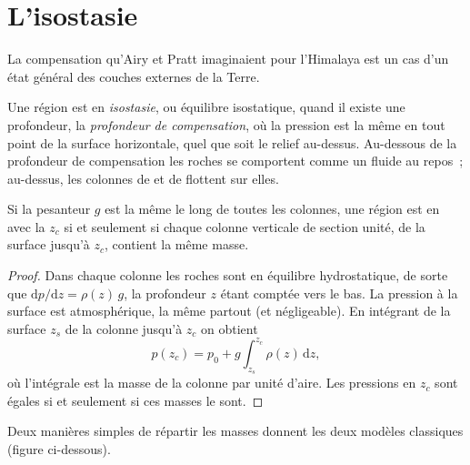 \section{L'isostasie}

La compensation qu'Airy et Pratt imaginaient pour l'Himalaya est un cas d'un état
général des couches externes de la Terre.

\begin{definition}\label{def:b1:isostasy-gravity:isostasy}
Une région est en \emph{isostasie}, ou équilibre isostatique, quand
il existe une profondeur, la \emph{profondeur de compensation},
où la pression est la même en tout point de la surface horizontale,
quel que soit le relief au-dessus. Au-dessous de la profondeur de compensation les
roches se comportent comme un fluide au repos~; au-dessus, les colonnes de  et
de  flottent sur elles.
\end{definition}

\begin{proposition}\label{prop:b1:isostasy-gravity:equal-mass}
Si la pesanteur $g$ est la même le long de toutes les colonnes, une région est en
 avec la  $z_c$ si et seulement si chaque colonne
verticale de section unité, de la surface jusqu'à $z_c$, contient la même masse.
\end{proposition}

\begin{proof}
Dans chaque colonne les roches sont en équilibre hydrostatique, de sorte que
$\mathrm dp/\mathrm dz = \rho(z)\,g$, la profondeur $z$ étant comptée vers le bas. La
pression à la surface est atmosphérique, la même partout (et négligeable).
En intégrant de la surface $z_s$ de la colonne jusqu'à $z_c$ on obtient
\[
  p(z_c) = p_0 + g\int_{z_s}^{z_c}\rho(z)\,\mathrm dz ,
\]
où l'intégrale est la masse de la colonne par unité d'aire. Les pressions en
$z_c$ sont égales si et seulement si ces masses le sont.
\end{proof}

Deux manières simples de répartir les masses donnent les deux modèles classiques
(figure ci-dessous).

